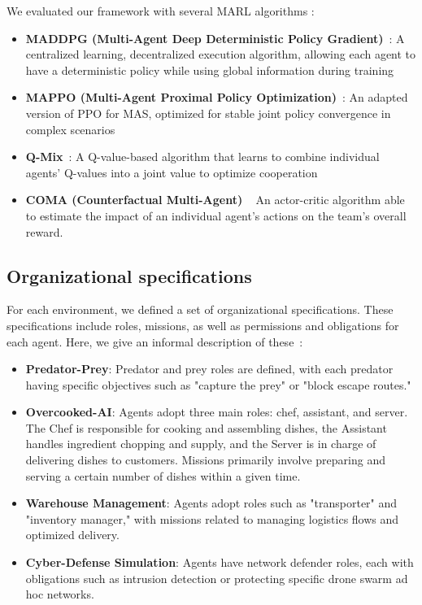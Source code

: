 \documentclass[conference]{IEEEtran}
\begin{document}
We evaluated our framework with several MARL algorithms :
%
\begin{itemize}
    \item \textbf{MADDPG (Multi-Agent Deep Deterministic Policy Gradient)}~\cite{lowe2017multi}: A centralized learning, decentralized execution algorithm, allowing each agent to have a deterministic policy while using global information during training
    
    \item \textbf{MAPPO (Multi-Agent Proximal Policy Optimization)}~\cite{yu2021mappo}: An adapted version of PPO for MAS, optimized for stable joint policy convergence in complex scenarios
    
    \item \textbf{Q-Mix}~\cite{rashid2018qmix}: A Q-value-based algorithm that learns to combine individual agents' Q-values into a joint value to optimize cooperation
    
    \item \textbf{COMA (Counterfactual Multi-Agent) }~\cite{foerster2018counterfactual} An actor-critic algorithm able to estimate the impact of an individual agent's actions on the team's overall reward.
\end{itemize}

\subsection{Organizational specifications}

For each environment, we defined a set of organizational specifications. These specifications include roles, missions, as well as permissions and obligations for each agent. Here, we give an informal description of these~\hyperref[fn:github]{\footnotemark[1]}:
%
\begin{itemize}
    \item \textbf{Predator-Prey}: Predator and prey roles are defined, with each predator having specific objectives such as "capture the prey" or "block escape routes."

    \item \textbf{Overcooked-AI}: Agents adopt three main roles: chef, assistant, and server. The Chef is responsible for cooking and assembling dishes, the Assistant handles ingredient chopping and supply, and the Server is in charge of delivering dishes to customers. Missions primarily involve preparing and serving a certain number of dishes within a given time.
    
    \item \textbf{Warehouse Management}: Agents adopt roles such as "transporter" and "inventory manager," with missions related to managing logistics flows and optimized delivery.
    
    \item \textbf{Cyber-Defense Simulation}: Agents have network defender roles, each with obligations such as intrusion detection or protecting specific drone swarm ad hoc networks.
\end{itemize}
\end{document}
